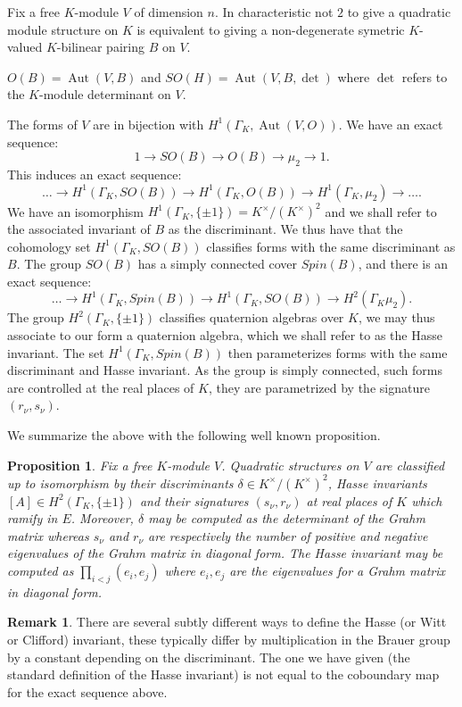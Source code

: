 \documentclass{article}
\theoremstyle{plain}
\newtheorem{proposition}[theorem]{Proposition}
\theoremstyle{definition}
\newtheorem{remark}[theorem]{Remark}
\numberwithin{equation}{section}
\DeclareMathOperator{\Aut}{Aut}
\newcommand{\GalKbK}{\Gamma_K}
\begin{document}
Fix a free $K$-module $V$ of dimension $n$. In characteristic not $2$ to give a quadratic module structure on $K$ is equivalent to giving a non-degenerate symetric $K$-valued $K$-bilinear pairing $B$ on $V$.

$O(B) = \Aut(V,B)$ and $SO(H) = \Aut(V,B,\det)$ where $\det$ refers to the $K$-module determinant on $V$.

The forms of $V$ are in bijection with $H^1(\GalKbK, \Aut(V,O))$.
We have an exact sequence:
\[ 1 \rightarrow SO(B) \rightarrow O(B) \rightarrow \mu_2  \rightarrow 1. \]
This induces an exact sequence:
\[ \ldots \rightarrow H^1(\GalKbK,SO(B))  \rightarrow H^1(\GalKbK,O(B))  \rightarrow H^1(\GalKbK,\mu_2 ) \rightarrow \ldots. \]
We have an isomorphism $H^1(\GalKbK, \{\pm1\}) = K^\times/(K^\times)^2$ and we shall refer to the associated invariant of $B$ as the discriminant.
We thus have that the cohomology set $H^1(\GalKbK,SO(B))$ classifies forms with the same discriminant as $B$.
The group $SO(B)$ has a simply connected cover $Spin(B)$, and there is an exact sequence:
\[ \ldots \rightarrow H^1(\GalKbK,Spin(B))  \rightarrow H^1(\GalKbK,SO(B))  \rightarrow H^2(\GalKbK \mu_2 ).\]
The group $H^2(\GalKbK,\{ \pm 1 \} )$ classifies quaternion algebras over $K$, we may thus associate to our form a quaternion algebra, which we shall refer to as the Hasse invariant.
The set $H^1(\GalKbK,Spin(B)) $ then parameterizes forms with the same discriminant and Hasse invariant. As the group is simply connected, such forms are controlled at the real places of $K$, they are parametrized by the signature $(r_\nu,s_\nu)$.

We summarize the above with the following well known proposition.
\begin{proposition}
Fix a free $K$-module $V$.
Quadratic structures on $V$ are classified up to isomorphism by their discriminants $\delta \in K^\times/(K^\times)^2$, Hasse invariants $[A] \in  H^2(\GalKbK,\{ \pm 1 \} )$ and their signatures $(s_\nu,r_\nu)$ at real places of $K$ which ramify in $E$.
Moreover, $\delta$ may be computed as the determinant of the Grahm matrix whereas $s_\nu$ and $r_\nu$ are respectively the number of positive and negative eigenvalues of the Grahm matrix in diagonal form.
The Hasse invariant may be computed as $\prod_{i<j}(e_i,e_j)$ where $e_i,e_j$ are the eigenvalues for a Grahm matrix in diagonal form.
\end{proposition}

\begin{remark}
There are several subtly different ways to define the Hasse (or Witt or Clifford) invariant, these typically differ by multiplication in the Brauer group by a constant depending on the discriminant.
The one we have given (the standard definition of the Hasse invariant) is not equal to the coboundary map for the exact sequence above.
\end{remark}
\end{document}

